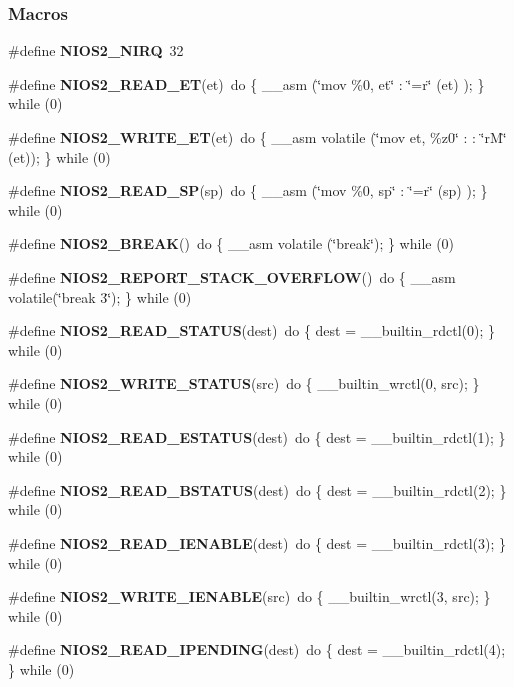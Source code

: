 \subsubsection*{Macros}
\begin{DoxyCompactItemize}
\item 
\#define {\bf N\+I\+O\+S2\+\_\+\+N\+I\+RQ}~32
\item 
\#define {\bf N\+I\+O\+S2\+\_\+\+R\+E\+A\+D\+\_\+\+ET}(et)~do \{ \+\_\+\+\_\+asm (\char`\"{}mov \%0, et\char`\"{} \+: \char`\"{}=r\char`\"{} (et) ); \} while (0)
\item 
\#define {\bf N\+I\+O\+S2\+\_\+\+W\+R\+I\+T\+E\+\_\+\+ET}(et)~do \{ \+\_\+\+\_\+asm volatile (\char`\"{}mov et, \%z0\char`\"{} \+: \+: \char`\"{}rM\char`\"{} (et)); \} while (0)
\item 
\#define {\bf N\+I\+O\+S2\+\_\+\+R\+E\+A\+D\+\_\+\+SP}(sp)~do \{ \+\_\+\+\_\+asm (\char`\"{}mov \%0, sp\char`\"{} \+: \char`\"{}=r\char`\"{} (sp) ); \} while (0)
\item 
\#define {\bf N\+I\+O\+S2\+\_\+\+B\+R\+E\+AK}()~do \{ \+\_\+\+\_\+asm volatile (\char`\"{}break\char`\"{}); \} while (0)
\item 
\#define {\bf N\+I\+O\+S2\+\_\+\+R\+E\+P\+O\+R\+T\+\_\+\+S\+T\+A\+C\+K\+\_\+\+O\+V\+E\+R\+F\+L\+OW}()~do \{ \+\_\+\+\_\+asm volatile(\char`\"{}break 3\char`\"{}); \} while (0)
\item 
\#define {\bf N\+I\+O\+S2\+\_\+\+R\+E\+A\+D\+\_\+\+S\+T\+A\+T\+US}(dest)~do \{ dest = \+\_\+\+\_\+builtin\+\_\+rdctl(0); \} while (0)
\item 
\#define {\bf N\+I\+O\+S2\+\_\+\+W\+R\+I\+T\+E\+\_\+\+S\+T\+A\+T\+US}(src)~do \{ \+\_\+\+\_\+builtin\+\_\+wrctl(0, src); \} while (0)
\item 
\#define {\bf N\+I\+O\+S2\+\_\+\+R\+E\+A\+D\+\_\+\+E\+S\+T\+A\+T\+US}(dest)~do \{ dest = \+\_\+\+\_\+builtin\+\_\+rdctl(1); \} while (0)
\item 
\#define {\bf N\+I\+O\+S2\+\_\+\+R\+E\+A\+D\+\_\+\+B\+S\+T\+A\+T\+US}(dest)~do \{ dest = \+\_\+\+\_\+builtin\+\_\+rdctl(2); \} while (0)
\item 
\#define {\bf N\+I\+O\+S2\+\_\+\+R\+E\+A\+D\+\_\+\+I\+E\+N\+A\+B\+LE}(dest)~do \{ dest = \+\_\+\+\_\+builtin\+\_\+rdctl(3); \} while (0)
\item 
\#define {\bf N\+I\+O\+S2\+\_\+\+W\+R\+I\+T\+E\+\_\+\+I\+E\+N\+A\+B\+LE}(src)~do \{ \+\_\+\+\_\+builtin\+\_\+wrctl(3, src); \} while (0)
\item 
\#define {\bf N\+I\+O\+S2\+\_\+\+R\+E\+A\+D\+\_\+\+I\+P\+E\+N\+D\+I\+NG}(dest)~do \{ dest = \+\_\+\+\_\+builtin\+\_\+rdctl(4); \} while (0)

\end{DoxyCompactItemize}
